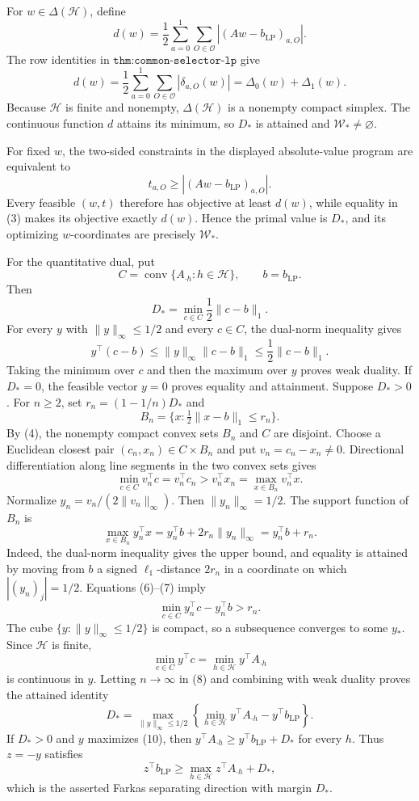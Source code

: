 For \(w\in\Delta(\mathcal H)\), define
\[
d(w)=\frac12\sum_{a=0}^1\sum_{O\in\mathcal O}|(Aw-b_{\mathrm{LP}})_{a,O}|.
\tag{1}
\]
The row identities in \(\texttt{thm:common-selector-lp}\) give
\[
d(w)=\frac12\sum_{a=0}^1\sum_{O\in\mathcal O}|\delta_{a,O}(w)|=\Delta_0(w)+\Delta_1(w).
\tag{2}
\]
Because \(\mathcal H\) is finite and nonempty, \(\Delta(\mathcal H)\) is a nonempty compact simplex. The continuous function \(d\) attains its minimum, so \(D_*\) is attained and \(\mathcal W_*\ne\varnothing\).

For fixed \(w\), the two-sided constraints in the displayed absolute-value program are equivalent to
\[
t_{a,O}\ge |(Aw-b_{\mathrm{LP}})_{a,O}|.
\tag{3}
\]
Every feasible \((w,t)\) therefore has objective at least \(d(w)\), while equality in (3) makes its objective exactly \(d(w)\). Hence the primal value is \(D_*\), and its optimizing \(w\)-coordinates are precisely \(\mathcal W_*\).

For the quantitative dual, put
\[
C=\operatorname{conv}\{A_{\cdot h}:h\in\mathcal H\},\qquad b=b_{\mathrm{LP}}.
\]
Then
\[
D_*=\min_{c\in C}\frac12\lVert c-b\rVert_1.
\tag{4}
\]
For every \(y\) with \(\lVert y\rVert_\infty\le1/2\) and every \(c\in C\), the dual-norm inequality gives
\[
y^\top(c-b)\le\lVert y\rVert_\infty\lVert c-b\rVert_1\le\frac12\lVert c-b\rVert_1.
\tag{5}
\]
Taking the minimum over \(c\) and then the maximum over \(y\) proves weak duality. If \(D_*=0\), the feasible vector \(y=0\) proves equality and attainment. Suppose \(D_*>0\). For \(n\ge2\), set \(r_n=(1-1/n)D_*\) and
\[
B_n=\{x:\tfrac12\lVert x-b\rVert_1\le r_n\}.
\]
By (4), the nonempty compact convex sets \(B_n\) and \(C\) are disjoint. Choose a Euclidean closest pair \((c_n,x_n)\in C\times B_n\) and put \(v_n=c_n-x_n\ne0\). Directional differentiation along line segments in the two convex sets gives
\[
\min_{c\in C}v_n^\top c=v_n^\top c_n>v_n^\top x_n=\max_{x\in B_n}v_n^\top x.
\tag{6}
\]
Normalize \(y_n=v_n/(2\lVert v_n\rVert_\infty)\). Then \(\lVert y_n\rVert_\infty=1/2\). The support function of \(B_n\) is
\[
\max_{x\in B_n}y_n^\top x=y_n^\top b+2r_n\lVert y_n\rVert_\infty=y_n^\top b+r_n.
\tag{7}
\]
Indeed, the dual-norm inequality gives the upper bound, and equality is attained by moving from \(b\) a signed \(\ell_1\)-distance \(2r_n\) in a coordinate on which \(|(y_n)_j|=1/2\). Equations (6)--(7) imply
\[
\min_{c\in C}y_n^\top c-y_n^\top b>r_n.
\tag{8}
\]
The cube \(\{y:\lVert y\rVert_\infty\le1/2\}\) is compact, so a subsequence converges to some \(y_*\). Since \(\mathcal H\) is finite,
\[
\min_{c\in C}y^\top c=\min_{h\in\mathcal H}y^\top A_{\cdot h}
\tag{9}
\]
is continuous in \(y\). Letting \(n\to\infty\) in (8) and combining with weak duality proves the attained identity
\[
D_*=\max_{\lVert y\rVert_\infty\le1/2}\left\{\min_{h\in\mathcal H}y^\top A_{\cdot h}-y^\top b_{\mathrm{LP}}\right\}.
\tag{10}
\]
If \(D_*>0\) and \(y\) maximizes (10), then \(y^\top A_{\cdot h}\ge y^\top b_{\mathrm{LP}}+D_*\) for every \(h\). Thus \(z=-y\) satisfies
\[
z^\top b_{\mathrm{LP}}\ge\max_{h\in\mathcal H}z^\top A_{\cdot h}+D_*,
\tag{11}
\]
which is the asserted Farkas separating direction with margin \(D_*\).

